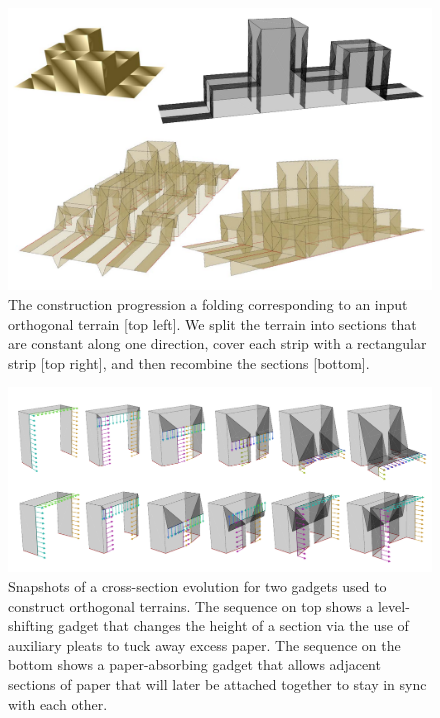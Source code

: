 \documentclass[a4paper,11pt]{article}
\begin{document}
\begin{figure}
  \centering
  \includegraphics[width=\linewidth]{Figures/fig1sm.pdf}
  \caption{The construction progression a folding corresponding to an input
orthogonal terrain [top left]. We split the terrain into sections that are
constant along one direction, cover each strip with a rectangular strip [top
right], and then recombine the sections [bottom]. }
 \label{fig:extrude}
\end{figure}
\begin{figure}
  \centering
  \includegraphics[width=\linewidth]{Figures/fig2sm.pdf}
  \caption{Snapshots of a cross-section evolution for two gadgets used to
construct orthogonal terrains. The sequence on top shows a level-shifting gadget
that changes the height of a section via the use of auxiliary pleats to tuck 
away excess paper. The sequence on the bottom shows a paper-absorbing gadget
that allows adjacent sections of paper that will later be attached together to
stay in sync with each other. }
 \label{fig:extrude}
\end{figure}
\end{document}
